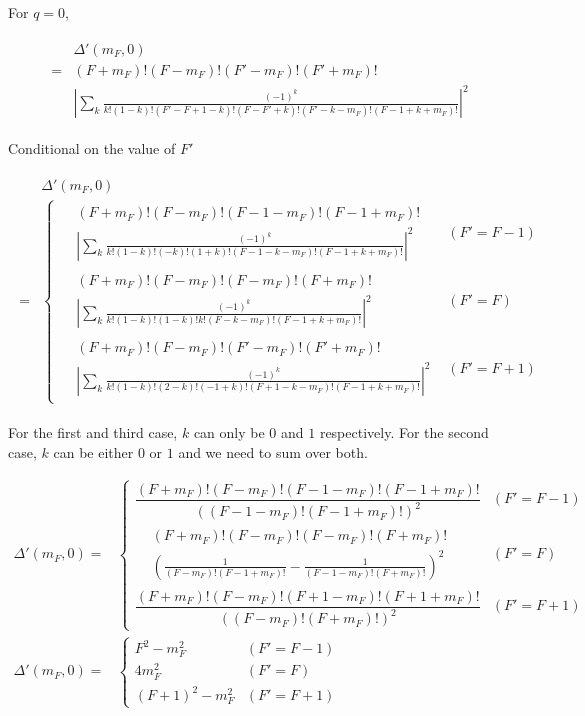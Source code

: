 \documentclass[10pt,fleqn]{article}
\newcommand{\eqar}[1]
{
  \begin{align}
    #1
  \end{align}
}
\newcommand{\paren}[1]{{\left({#1}\right)}}
\newcommand{\abs}[1]{{\left|{#1}\right|}}
\begin{document}
For $q=0$,
\eqar{
  \begin{split}
    &\Delta'(m_F,0)\\
    =&(F+m_F)!(F-m_F)!(F'-m_F)!(F'+m_F)!\\
    &\abs{\sum_{k}\frac{(-1)^k}{k!(1\!-\!k)!(F'\!-\!F\!+\!1\!-\!k)!(F\!-\!F'\!+\!k)!(F'\!-\!k\!-\!m_F)!(F\!-\!1\!+\!k\!+\!m_F)!}}^2
  \end{split}
}
Conditional on the value of $F'$
\eqar{
  \begin{split}
    &\Delta'(m_F,0)\\
    =&\begin{cases}
      \begin{aligned}
        &(F+m_F)!(F-m_F)!(F-1-m_F)!(F-1+m_F)!\\
        &\abs{\sum_{k}\frac{(-1)^k}{k!(1\!-\!k)!(-k)!(1\!+\!k)!(F\!-\!1\!-\!k\!-\!m_F)!(F\!-\!1\!+\!k\!+\!m_F)!}}^2
      \end{aligned}&(F'=F-1)\\
      \begin{aligned}
        &(F+m_F)!(F-m_F)!(F-m_F)!(F+m_F)!\\
        &\abs{\sum_{k}\frac{(-1)^k}{k!(1\!-\!k)!(1\!-\!k)!k!(F\!-\!k\!-\!m_F)!(F\!-\!1\!+\!k\!+\!m_F)!}}^2
      \end{aligned}&(F'=F)\\
      \begin{aligned}
        &(F+m_F)!(F-m_F)!(F'-m_F)!(F'+m_F)!\\
        &\abs{\sum_{k}\frac{(-1)^k}{k!(1\!-\!k)!(2\!-\!k)!(-1\!+\!k)!(F\!+\!1\!-\!k\!-\!m_F)!(F\!-\!1\!+\!k\!+\!m_F)!}}^2
      \end{aligned}&(F'=F+1)
    \end{cases}
  \end{split}
}
For the first and third case, $k$ can only be $0$ and $1$ respectively.
For the second case, $k$ can be either $0$ or $1$ and we need to sum over both.
\eqar{
  \Delta'(m_F,0)=&\begin{cases}
    \dfrac{(F+m_F)!(F-m_F)!(F-1-m_F)!(F-1+m_F)!}{\paren{(F\!-\!1\!-\!m_F)!(F\!-\!1\!+\!m_F)!}^2}&(F'=F-1)\\
    \begin{aligned}
      &(F+m_F)!(F-m_F)!(F-m_F)!(F+m_F)!\\
      &\paren{
        \frac{1}{(F\!-\!m_F)!(F\!-\!1\!+\!m_F)!}
        -\frac{1}{(F\!-\!1\!-\!m_F)!(F\!+\!m_F)!}
        }^2
    \end{aligned}&(F'=F)\\
    \dfrac{(F+m_F)!(F-m_F)!(F+1-m_F)!(F+1+m_F)!}{\paren{(F\!-\!m_F)!(F\!+\!m_F)!}^2}
                                                                                                &(F'=F+1)
  \end{cases}\\
  \Delta'(m_F,0)=&\begin{cases}
    F^2-m_F^2&(F'=F-1)\\
    4m_F^2&(F'=F)\\
    (F+1)^2-m_F^2&(F'=F+1)
  \end{cases}
}
\end{document}
